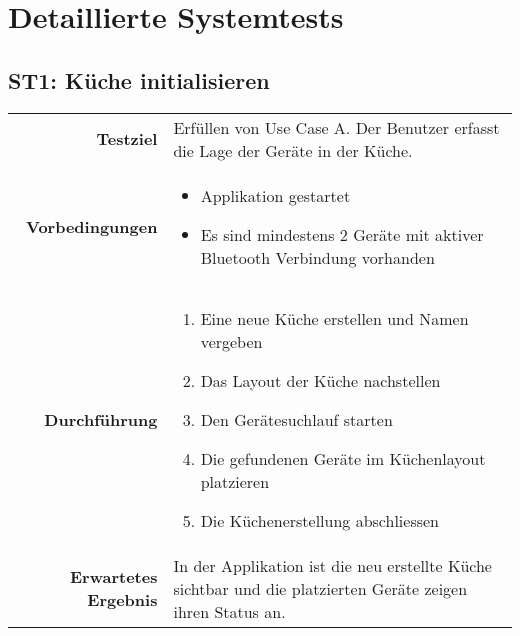 \section{Detaillierte Systemtests}

\subsection{ST1: Küche initialisieren}
\begin{table}[H]
\begin{tabularx}{\textwidth}{r X }
\textbf{Testziel} & Erfüllen von Use Case A. Der Benutzer erfasst die Lage der Geräte in der Küche. \\
\textbf{Vorbedingungen} & \begin{itemize}
\item Applikation gestartet
\item Es sind mindestens 2 Geräte mit aktiver Bluetooth Verbindung vorhanden
\end{itemize} \\
\textbf{Durchführung} & \begin{enumerate}
\item Eine neue Küche erstellen und Namen vergeben
\item Das Layout der Küche nachstellen
\item Den Gerätesuchlauf starten
\item Die gefundenen Geräte im Küchenlayout platzieren
\item Die Küchenerstellung abschliessen
\end{enumerate} \\
\textbf{Erwartetes Ergebnis} & In der Applikation ist die neu erstellte Küche sichtbar und die platzierten Geräte zeigen ihren Status an.\\
\end{tabularx}
\end{table}

